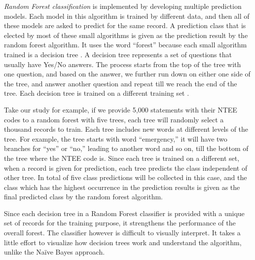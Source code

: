 \documentclass[11pt]{article}
\begin{document}

\textit{Random Forest classification} is implemented by developing multiple prediction models. Each model in this algorithm is trained by different data, and then all of these models are asked to predict for the same record. A prediction class that is elected by most of these small algorithms is given as the prediction result by the random forest algorithm. It uses the word ``forest'' because each small algorithm trained is a decision tree \parencites[83]{QuinlanInductiondecisiontrees1986}. A decision tree represents a set of questions that usually have Yes/No answers. The process starts from the top of the tree with one question, and based on the answer, we further run down on either one side of the tree, and answer another question and repeat till we reach the end of the tree. Each decision tree is trained on a different training set \parencites[124]{BreimanBaggingpredictors1996}. 

Take our study for example, if we provide 5,000 statements with their NTEE codes to a random forest with five trees, each tree will randomly select a thousand records to train. Each tree includes new words at different levels of the tree. For example, the tree starts with word ``emergency,'' it will have two branches for ``yes'' or ``no,'' leading to another word and so on, till the bottom of the tree where the NTEE code is. Since each tree is trained on a different set, when a record is given for prediction, each tree predicts the class independent of other tree. In total of five class predictions will be collected in this case, and the class which has the highest occurrence in the prediction results is given as the final predicted class by the random forest algorithm. 

Since each decision tree in a Random Forest classifier is provided with a unique set of records for the training purpose, it strengthens the performance of the overall forest. The classifier however is difficult to visually interpret. It takes a little effort to visualize how decision trees work and understand the algorithm, unlike the Na\"ive Bayes approach.
\end{document}
